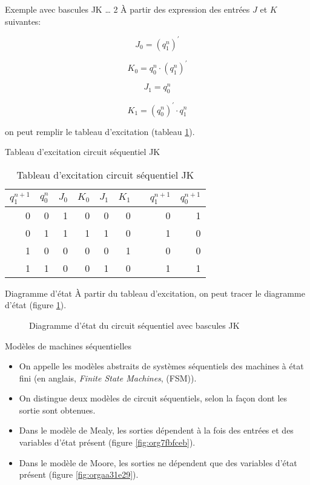 \documentclass[presentation]{beamer}
\begin{document}
\begin{frame}[label={sec:orgcbf2e40}]{Exemple avec bascules JK \ldots{} 2}
À partir des expression des entrées \(J\) et \(K\) suivantes:

$$ J_0 = (q_1^{n})^\prime $$

$$ K_0 = q_0^{n} \cdot (q_1^{n})^\prime $$

$$ J_1 = q_0^{n} $$

$$ K_1 = (q_0^{n})^\prime \cdot q_1^{n} $$

on peut remplir le tableau d'excitation (tableau \ref{tab:org6166e18}).
\end{frame}

\begin{frame}[label={sec:orga7c25cf}]{Tableau d'excitation circuit séquentiel JK}
\begin{table}[htbp]
\caption{\label{tab:org6166e18}Tableau d'excitation circuit séquentiel JK}
\centering
\begin{tabular}{rrrrrrlrr}
\(q_1^{n+1}\) & \(q_0^n\) & \(J_0\) & \(K_0\) & \(J_1\) & \(K_1\) &  & \(q_1^{n+1}\) & \(q_0^{n+1}\)\\
\hline
0 & 0 & 1 & 0 & 0 & 0 &  & 0 & 1\\
0 & 1 & 1 & 1 & 1 & 0 &  & 1 & 0\\
1 & 0 & 0 & 0 & 0 & 1 &  & 0 & 0\\
1 & 1 & 0 & 0 & 1 & 0 &  & 1 & 1\\
\end{tabular}
\end{table}
\end{frame}

\begin{frame}[label={sec:orgd4e853a}]{Diagramme d'état}
À partir du tableau d'excitation, on peut tracer le diagramme d'état
(figure \ref{fig:org3cd5540}).

\begin{figure}[htbp]
\centering

\caption{\label{fig:org3cd5540}Diagramme d'état du circuit séquentiel avec bascules JK}
\end{figure}
\end{frame}

\begin{frame}[label={sec:org0063b9d}]{Modèles de machines séquentielles}
\begin{itemize}
\item On appelle les modèles abstraits de systèmes séquentiels des \alert{machines à état fini} (en anglais, \emph{Finite State Machines}, (FSM)).

\item On distingue deux modèles de circuit séquentiels, selon la façon dont les sortie sont obtenues.

\item Dans le modèle de Mealy, les sorties dépendent à la fois des entrées et des variables d'état présent (figure \ref{fig:org7fbfceb}).

\item Dans le modèle de Moore, les sorties ne dépendent que des variables d'état présent (figure \ref{fig:orgaa31e29}).
\end{itemize}
\end{frame}
\end{document}
